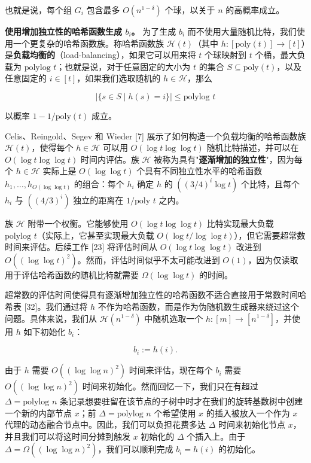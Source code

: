 \documentclass[12pt,a4paper]{ctexart}
\theoremstyle{remark}
\begin{document}
也就是说，每个组 $G_i$ 包含最多 $O(n^{1-\delta})$ 个球，以关于 $n$ 的高概率成立。

\textbf{使用增加独立性的哈希函数生成 $b_i$。} 为了生成 $b_i$ 而不使用大量随机比特，我们使用一个更复杂的哈希函数族。称哈希函数族 $\mathcal{H}(t)$（其中 $h:[\text{poly}(t)]\to[t]$）是\textbf{负载均衡的}（load-balancing），如果它可以用来将 $t$ 个球映射到 $t$ 个桶，最大负载为 $\text{polylog } t$；也就是说，对于任意固定的大小为 $t$ 的集合 $S\subseteq\text{poly}(t)$，以及任意固定的 $i\in[t]$，如果我们选取随机的 $h\in\mathcal{H}$，那么

$$|\{s\in S\mid h(s)=i\}|\leq\text{polylog } t$$

以概率 $1-1/\text{poly}(t)$ 成立。

Celis、Reingold、Segev 和 Wieder [7] 展示了如何构造一个负载均衡的哈希函数族 $\mathcal{H}(t)$，使得每个 $h\in\mathcal{H}$ 可以用 $O(\log t\log\log t)$ 随机比特描述，并可以在 $O(\log t\log\log t)$ 时间内评估。族 $\mathcal{H}$ 被称为具有"\textbf{逐渐增加的独立性}"，因为每个 $h\in\mathcal{H}$ 实际上是 $O(\log\log t)$ 个具有不同独立性水平的哈希函数 $h_1,\ldots,h_{O(\log\log t)}$ 的组合：每个 $h_i$ 确定 $h$ 的 $((3/4)^i\log t)$ 个比特，且每个 $h_i$ 与 $((4/3)^i)$ 独立的距离在 $1/\text{poly } t$ 之内。

族 $\mathcal{H}$ 附带一个权衡。它能够使用 $O(\log t\log\log t)$ 比特实现最大负载 $\text{polylog } t$（实际上，它甚至实现最大负载 $O(\log t/\log\log t)$），但它需要超常数时间来评估。后续工作 [23] 将评估时间从 $O(\log t\log\log t)$ 改进到 $O((\log\log t)^2)$。然而，评估时间似乎不太可能改进到 $O(1)$，因为仅读取用于评估哈希函数的随机比特就需要 $\Omega(\log\log t)$ 的时间。

超常数的评估时间使得具有逐渐增加独立性的哈希函数不适合直接用于常数时间哈希表 [32]。我们通过将 $h$ 不作为哈希函数，而是作为伪随机数生成器来绕过这个问题。具体来说，我们从 $\mathcal{H}(n^{1-\delta})$ 中随机选取一个 $h:[m]\to[n^{1-\delta}]$，并使用 $h$ 如下初始化 $b_i$：

$$b_i:=h(i).$$

由于 $h$ 需要 $O((\log\log n)^2)$ 时间来评估，现在每个 $b_i$ 需要 $O((\log\log n)^2)$ 时间来初始化。然而回忆一下，我们只在有超过 $\Delta=\text{polylog } n$ 条记录想要驻留在该节点的子树中时才在我们的旋转基数树中创建一个新的内部节点 $x$；前 $\Delta=\text{polylog } n$ 个希望使用 $x$ 的插入被放入一个作为 $x$ 代理的动态融合节点中。因此，我们可以负担花费多达 $\Delta$ 时间来初始化节点 $x$，并且我们可以将这时间分摊到触发 $x$ 初始化的 $\Delta$ 个插入上。由于 $\Delta=\Omega((\log\log n)^2)$，我们可以顺利完成 $b_i=h(i)$ 的初始化。
\end{document}
